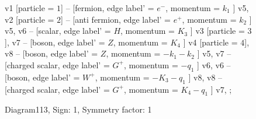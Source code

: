 \documentclass{revtex4}
\begin{document}
\begin{figure}[!htb]
\begin{center}
{    %
v1 [particle = \(1\)] -- [fermion, edge label' = \(e^{-}\), momentum = \(k_{1}\) ] v5, 
v2 [particle = \(2\)] -- [anti fermion, edge label' = \(e^{+}\), momentum = \(k_{2}\) ] v5, 
v6 -- [scalar, edge label' = \(H\), momentum = \(K_{3}\) ] v3 [particle = \(3\)], 
v7 -- [boson, edge label' = \(Z\), momentum = \(K_{4}\) ] v4 [particle = \(4\)], 
v8 -- [boson, edge label' = \(Z\), momentum = \(-k_{1} - k_{2}\) ] v5, 
v7 -- [charged scalar, edge label' = \(G^{+}\), momentum = \(-q_{1}\) ] v6, 
v6 -- [boson, edge label' = \(W^{+}\), momentum = \(-K_{3} - q_{1}\) ] v8, 
v8 -- [charged scalar, edge label' = \(G^{+}\), momentum = \(K_{4} - q_{1}\) ] v7, 
};
\end{center}
\caption{Diagram113, Sign: 1, Symmetry factor: 1}
\end{figure}
\newpage
\end{document}
